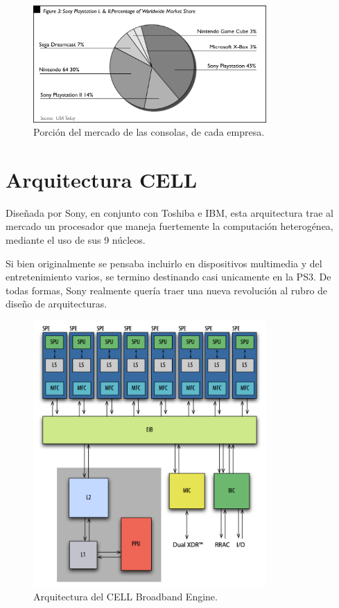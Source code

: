 \documentclass[10pt,compsoc]{IEEEtran}
\begin{document}
	

	\begin{figure}[H]
	\centering
	\includegraphics[width=3.5in]{imgs/marketshare.png}
	\caption{Porción del mercado de las consolas, de cada empresa.}
	\label{fig1}
	\end{figure}	
	
	
	\section{Arquitectura CELL}	%
	\noindent Diseñada por Sony, en conjunto con Toshiba e IBM, esta arquitectura trae al mercado un procesador que maneja fuertemente la computación heterogénea, mediante el uso de sus 9 núcleos. 
	
	Si bien originalmente se pensaba incluirlo en dispositivos multimedia y del entretenimiento varios, se termino destinando casi unicamente en la PS3. De todas formas, Sony realmente quería traer una nueva revolución al rubro de diseño de arquitecturas.\newline
	
	\begin{figure}[H]
	\centering
	\includegraphics[width=3.5in]{imgs/arquitecturacell.png}
	\caption{Arquitectura del CELL Broadband Engine.}
	\label{fig3}
	\end{figure}
	
\end{document}
